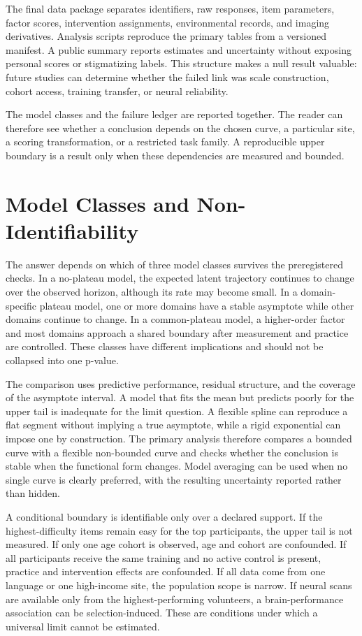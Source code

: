 \documentclass[conference]{IEEEtran}
\begin{document}
The final data package separates identifiers, raw responses, item parameters, factor scores, intervention assignments, environmental records, and imaging derivatives. Analysis scripts reproduce the primary tables from a versioned manifest. A public summary reports estimates and uncertainty without exposing personal scores or stigmatizing labels. This structure makes a null result valuable: future studies can determine whether the failed link was scale construction, cohort access, training transfer, or neural reliability.

The model classes and the failure ledger are reported together. The reader can therefore see whether a conclusion depends on the chosen curve, a particular site, a scoring transformation, or a restricted task family. A reproducible upper boundary is a result only when these dependencies are measured and bounded.

\section{Model Classes and Non-Identifiability}
\label{sec:modelclasses}
The answer depends on which of three model classes survives the preregistered checks. In a no-plateau model, the expected latent trajectory continues to change over the observed horizon, although its rate may become small. In a domain-specific plateau model, one or more domains have a stable asymptote while other domains continue to change. In a common-plateau model, a higher-order factor and most domains approach a shared boundary after measurement and practice are controlled. These classes have different implications and should not be collapsed into one p-value.

The comparison uses predictive performance, residual structure, and the coverage of the asymptote interval. A model that fits the mean but predicts poorly for the upper tail is inadequate for the limit question. A flexible spline can reproduce a flat segment without implying a true asymptote, while a rigid exponential can impose one by construction. The primary analysis therefore compares a bounded curve with a flexible non-bounded curve and checks whether the conclusion is stable when the functional form changes. Model averaging can be used when no single curve is clearly preferred, with the resulting uncertainty reported rather than hidden.

A conditional boundary is identifiable only over a declared support. If the highest-difficulty items remain easy for the top participants, the upper tail is not measured. If only one age cohort is observed, age and cohort are confounded. If all participants receive the same training and no active control is present, practice and intervention effects are confounded. If all data come from one language or one high-income site, the population scope is narrow. If neural scans are available only from the highest-performing volunteers, a brain-performance association can be selection-induced. These are conditions under which a universal limit cannot be estimated.
\end{document}

